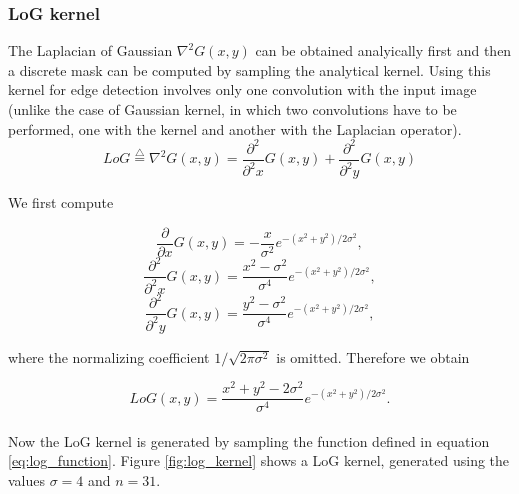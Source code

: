 \documentclass{ipol}
\numberwithin{equation}{section}
\numberwithin{table}{section}
\numberwithin{figure}{section}
\begin{document}

\subsubsection{LoG kernel}

The Laplacian of Gaussian $\nabla^2G(x,y)$ can be obtained analyically first and then a discrete mask 
can be computed by sampling the analytical kernel. Using this kernel for edge detection involves only 
one convolution with the input image (unlike the case of Gaussian kernel, in which two convolutions 
have to be performed, one with the kernel and another with the Laplacian operator).\\

\begin{equation}
	LoG \stackrel{\triangle}{=}\nabla^2G(x,y)=\frac{\partial^2}{\partial^2 x}G(x,y) + \frac{\partial^2}{\partial^2 y}G(x,y)
\end{equation}

We first compute

\begin{equation} 
	\frac{\partial}{\partial x}G(x,y)=-\frac{x}{\sigma^2}e^{-(x^2+y^2)/2\sigma^2},
\end{equation}
\begin{equation} 
	\frac{\partial^2}{\partial^2 x}G(x,y)=\frac{x^2-\sigma^2}{\sigma^4}e^{-(x^2+y^2)/2\sigma^2},
\end{equation}
\begin{equation} 
	\frac{\partial^2}{\partial^2 y}G(x,y)=\frac{y^2-\sigma^2}{\sigma^4}e^{-(x^2+y^2)/2\sigma^2},
\end{equation}

where the normalizing coefficient $1/\sqrt{2\pi\sigma^2}$ is omitted. Therefore we obtain

\begin{equation}
	\label{eq:log_function}
	LoG(x,y)=\frac{x^2+y^2-2\sigma^2}{\sigma^4}e^{-(x^2+y^2)/2\sigma^2}.
\end{equation}\\

Now the LoG kernel is generated by sampling the function defined in equation \ref{eq:log_function}. 
Figure \ref{fig:log_kernel} shows a LoG kernel, generated using the values $\sigma=4$ and $n=31$.
\end{document}
